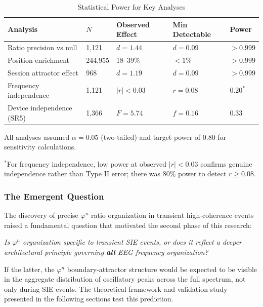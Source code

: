 \documentclass[11pt,a4paper]{article}
\newcommand{\phisym}{\varphi}
\begin{document}
\begin{table}[H]
\centering
\caption{Statistical Power for Key Analyses}
\label{tab:power_analysis}
\begin{tabular}{@{}lllll@{}}
\toprule
Analysis & $N$ & Observed Effect & Min Detectable & Power \\
\midrule
Ratio precision vs null & 1,121 & $d = 1.44$ & $d = 0.09$ & $>0.999$ \\
Position enrichment & 244,955 & 18--39\% & $<1\%$ & $>0.999$ \\
Session attractor effect & 968 & $d = 1.19$ & $d = 0.09$ & $>0.999$ \\
Frequency independence & 1,121 & $|r| < 0.03$ & $r = 0.08$ & $0.20^*$ \\
Device independence (SR5) & 1,366 & $F = 5.74$ & $f = 0.16$ & $0.33$ \\
\bottomrule
\end{tabular}
\begin{tablenotes}
\small
\item All analyses assumed $\alpha = 0.05$ (two-tailed) and target power of 0.80 for sensitivity calculations.
\item $^*$For frequency independence, low power at observed $|r| < 0.03$ confirms genuine independence rather than Type II error; there was 80\% power to detect $r \geq 0.08$.
\end{tablenotes}
\end{table}

\subsubsection{The Emergent Question}
The discovery of precise $\phisym^n$ ratio organization in transient high-coherence events raised a fundamental question that motivated the second phase of this research:

\textit{Is $\phisym^n$ organization specific to transient SIE events, or does it reflect a deeper architectural principle governing \textbf{all} EEG frequency organization?}

If the latter, the $\phisym^n$ boundary-attractor structure would be expected to be visible in the aggregate distribution of oscillatory peaks across the full spectrum, not only during SIE events. The theoretical framework and validation study presented in the following sections test this prediction.

\end{document}
